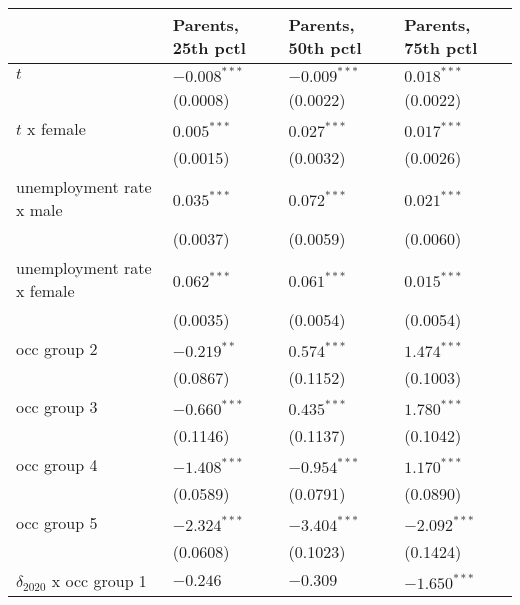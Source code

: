 \begin{tabular}{llll}
\toprule
{} & Parents, 25th pctl & Parents, 50th pctl & Parents, 75th pctl \\
\midrule
$t$                                    &     $-0.008^{***}$ &     $-0.009^{***}$ &      $0.018^{***}$ \\
                                       &           (0.0008) &           (0.0022) &           (0.0022) \\
$t$ x female                           &      $0.005^{***}$ &      $0.027^{***}$ &      $0.017^{***}$ \\
                                       &           (0.0015) &           (0.0032) &           (0.0026) \\
unemployment rate x male               &      $0.035^{***}$ &      $0.072^{***}$ &      $0.021^{***}$ \\
                                       &           (0.0037) &           (0.0059) &           (0.0060) \\
unemployment rate x female             &      $0.062^{***}$ &      $0.061^{***}$ &      $0.015^{***}$ \\
                                       &           (0.0035) &           (0.0054) &           (0.0054) \\
occ group 2                            &      $-0.219^{**}$ &      $0.574^{***}$ &      $1.474^{***}$ \\
                                       &           (0.0867) &           (0.1152) &           (0.1003) \\
occ group 3                            &     $-0.660^{***}$ &      $0.435^{***}$ &      $1.780^{***}$ \\
                                       &           (0.1146) &           (0.1137) &           (0.1042) \\
occ group 4                            &     $-1.408^{***}$ &     $-0.954^{***}$ &      $1.170^{***}$ \\
                                       &           (0.0589) &           (0.0791) &           (0.0890) \\
occ group 5                            &     $-2.324^{***}$ &     $-3.404^{***}$ &     $-2.092^{***}$ \\
                                       &           (0.0608) &           (0.1023) &           (0.1424) \\
$\delta_{2020}$ x occ group 1          &           $-0.246$ &           $-0.309$ &     $-1.650^{***}$ \\

\end{tabular}
